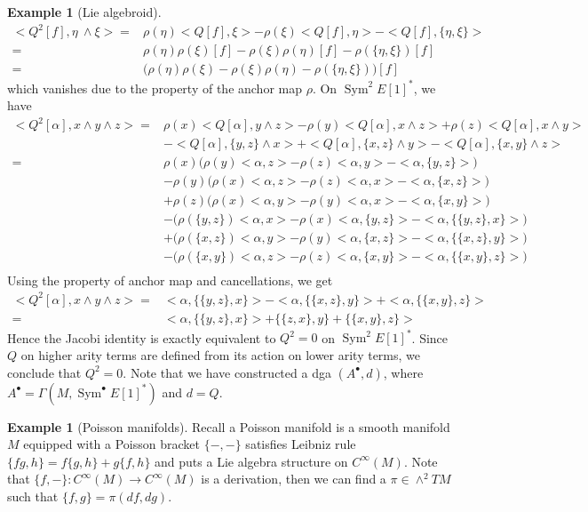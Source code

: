 \documentclass[12pt]{amsart}
\theoremstyle{definition}
\newtheorem{example}[thm]{Example}
\theoremstyle{remark}
\numberwithin{equation}{section}
\newcommand{\1}{{\mathbb{1}}}
\newcommand{\sym}{\operatorname{Sym}}
\begin{document}
\begin{example}[Lie algebroid]
	\begin{align*}
	<Q^2[f], \eta\ \wedge \xi>=&\rho(\eta)<Q[f],\xi>-\rho(\xi)<Q[f],\eta>-<Q[f], \{\eta, \xi \}>\\=& \rho(\eta)\rho(\xi)[f]-\rho(\xi)\rho(\eta)[f]-\rho(\{\eta, \xi \})[f] \\
	=& \bigg(\rho(\eta)\rho(\xi)-\rho(\xi)\rho(\eta)-\rho(\{\eta, \xi \})\bigg)[f] 
	\end{align*}
	which vanishes due to the property of the anchor map $\rho$.
	On $\sym^2 E[1]^*$, we have 
	\begin{align*}
<Q^2[\alpha], x\wedge y\wedge z> =&\rho(x) <Q[\alpha], y\wedge z>-\rho(y)<Q[\alpha], x\wedge z>+\rho(z)<Q[\alpha], x\wedge y>\\
&- <Q[\alpha],\{y,z \}\wedge x>+< Q[\alpha], \{x,z\}\wedge y>- <Q[\alpha], \{x,y\}\wedge z>\\
=& \rho(x)\bigg(\rho(y)<\alpha, z>-\rho(z)<\alpha,y>-<\alpha, \{y,z \}> \bigg)\\
&-\rho(y)\bigg(\rho(x)<\alpha, z>-\rho(z)<\alpha,x>-<\alpha, \{x,z \}> \bigg) \\
&+\rho(z)\bigg(\rho(x)<\alpha, y>-\rho(y)<\alpha,x>-<\alpha, \{x,y \}> \bigg)\\
&-\bigg(\rho(\{y,z\})<\alpha,x>-\rho(x)<\alpha, \{y,z \}>- <\alpha, \{\{y,z \},x\}> \bigg)\\
&+\bigg(\rho(\{x,z\})<\alpha,y>-\rho(y)<\alpha, \{x,z \}>- <\alpha, \{\{x,z \},y\}> \bigg)\\
&-\bigg(\rho(\{x,y\})<\alpha,z>-\rho(z)<\alpha, \{x,y \}>- <\alpha, \{\{x,y \},z\}> \bigg)\\
	\end{align*}
	Using the property of anchor map and cancellations, we get 
\begin{align*}
<Q^2[\alpha], x\wedge y\wedge z> =& <\alpha, \{\{y,z \},x\}>- <\alpha, \{\{x,z \},y\}> +<\alpha, \{\{x,y \},z\}>\\
=&<\alpha, \{\{y,z \},x\}>+ \{\{z,x \},y\}+\{\{x,y \},z\}>
\end{align*}
Hence the Jacobi identity is exactly equivalent to $Q^2=0$ on $\sym^2 E[1]^*$. Since $Q$ on higher arity terms are defined from its action on lower arity terms, we conclude that $Q^2=0$. Note that we have constructed a dga $(A^{\bullet},d)$, where  $A^{\bullet}=\Gamma(M, \sym^{\bullet} E[1]^*)$ and  $d=Q$.
\end{example}

\begin{example}[Poisson manifolds]
Recall a Poisson manifold is a smooth manifold $M$ equipped with a Poisson bracket $\{-,-\}$ satisfies Leibniz rule $\{fg,h\}=f\{g,h\}+g\{f,h\}$ and puts a Lie algebra structure on $C^{\infty}(M)$. Note that $\{f,- \}: C^{\infty}(M)\to 	C^{\infty}(M)$ is a derivation, then we can find a $\pi\in \wedge^2TM$ such that $\{f,g\}=\pi(df,dg)$. 

	
	
\end{example}
\end{document}
